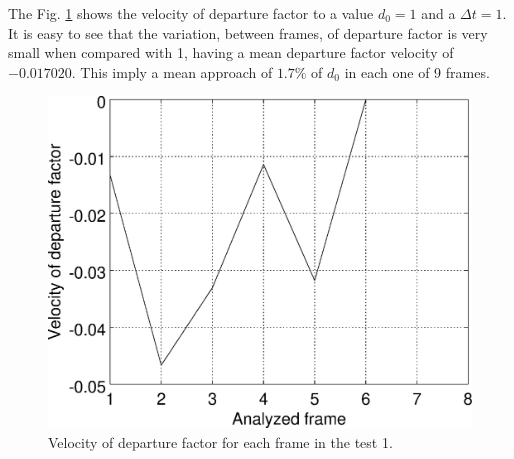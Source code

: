 The Fig. \ref{fig:res_graph1v} shows the velocity of departure factor
to a value $d_0=1$ and a $\Delta t=1$. It is easy to see that the variation,
between frames, of departure factor is very small when compared with 1, 
having a mean departure factor velocity of $-0.017020$. This imply a mean approach of $1.7\%$ of $d_0$
in each one of 9 frames.
\begin{figure}[!hbt]
\centering
\includegraphics[width=0.8\columnwidth]{images/graph1v.eps}
\caption{Velocity of departure factor for each frame in the test 1.}
\label{fig:res_graph1v}
\end{figure}


